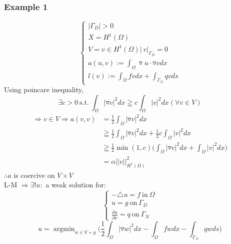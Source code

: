 \documentclass[a4paper,12pt]{article}
\DeclareMathOperator*{\argmin}{argmin}
\begin{document}
\subsubsection{Example 1}
\begin{equation*}
\begin{cases}
|\Gamma_D| > 0\\
X = H^1(\Omega)\\
V={v \in H^1(\Omega)|\ v|_{\Gamma_D}=0}\\
a(u,v) := \int_\Omega \triangledown u \cdot \triangledown v dx\\
l(v) := \int_\Omega fv dx + \int_{\Gamma_N} qv ds
\end{cases}
\end{equation*}
Using poincare inequality,
\begin{equation*}
\exists c>0\ \text{s.t.}\ \int_\Omega |\triangledown v|^2 dx \geqq c \int_\Omega |v|^2 dx (\forall v \in V)
\end{equation*}
\begin{equation*}
\begin{aligned}
\Rightarrow v \in V \Rightarrow a(v,v) &= \frac{1}{2} \int_\Omega |\triangledown v|^2 dx\\
&\geqq \frac{1}{2} \int_\Omega |\triangledown v|^2 dx + \frac{1}{2}c \int_\Omega |v|^2 dx\\
&\geqq \frac{1}{2} \min(1,c) \bigg( \int_\Omega |\triangledown v|^2 dx + \int_\Omega |v|^2 dx \bigg) \\
&= \alpha ||v||^2_{H^1(\Omega)}
\end{aligned}
\end{equation*}
$\therefore a$ is coercive on $V \times V$\\
L-M $\Rightarrow \exists! u:$ a weak solution for:
\begin{equation*}
\begin{cases}
-\triangle u = f\ \text{in}\ \Omega\\
u = g\ \text{on}\ \Gamma_D\\
\frac{\partial u}{\partial \nu} = q\ \text{on}\ \Gamma_N
\end{cases}
\end{equation*}
\begin{equation*}
u= \argmin_{w\in V+g} \bigg( \frac{1}{2} \int_\Omega |\triangledown w|^2 dx -\int_\Omega fw dx - \int_{\Gamma_N} qw ds \bigg)
\end{equation*}
\end{document}
